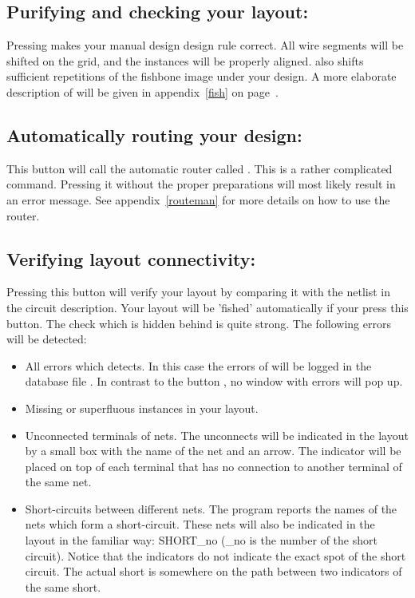 \subsection{Purifying and checking your layout: \protect{}}
\label{fish1}
Pressing  makes your manual design design rule correct.
All wire segments will be shifted on the grid, and the instances will
be properly aligned.  also shifts sufficient repetitions of
the fishbone image under your design.  A more elaborate description of
 will be given in appendix~\ref{fish} on page~\pageref{fish}.

\subsection{Automatically routing your design: \protect{}}
This button will call the automatic router called .
This is a rather complicated command. Pressing it without the
proper preparations will most likely result in an error message.
See appendix~\ref{routeman} for more details on how to use the router.

\subsection{Verifying layout connectivity: \protect{}}
\label{verify}
Pressing this button will verify your layout by comparing it with the
netlist in the circuit description. Your layout will be 'fished'
automatically if your press this button.  The check which is hidden
behind  is quite strong. The following errors will
be detected:
\begin{itemize}
\item
All errors which  detects. In this case the errors of
 will be logged in the database file .
In contrast to the button , no window with errors will pop up.
\item
Missing or superfluous instances in your layout. 
\item
Unconnected terminals of nets. The unconnects will be indicated in the
layout by a small box with the name of the net and an arrow.
The indicator will be placed on top of each terminal that has no
connection to another terminal of the same net.
\item
Short-circuits between different nets.  The program reports the names
of the nets which form a short-circuit.  These nets will also be
indicated in the layout in the familiar way: {\sf SHORT\_no} (\_no
is the number of the short circuit).  Notice that the indicators do not
indicate the exact spot of the short circuit. The actual short is
somewhere on the path between two indicators of the same short.
\end{itemize}

